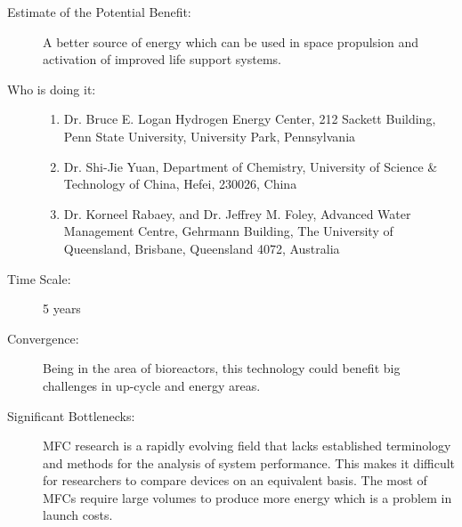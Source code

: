 \begin{description}
\item[Estimate  of the Potential Benefit:] A better source of energy which can
be used in space propulsion and  activation of improved life support
systems.
\item[Who is doing it:] \hfill
\begin{enumerate}
\item Dr. Bruce E. Logan Hydrogen  Energy Center, 212 Sackett Building,
Penn State  University, University Park, Pennsylvania
\item Dr. Shi-Jie Yuan, Department of  Chemistry, University of Science \&
Technology of China, Hefei, 230026,  China
\item Dr. Korneel Rabaey, and Dr.  Jeffrey M. Foley, Advanced Water
Management  Centre, Gehrmann Building, The University of Queensland,
Brisbane, Queensland 4072, Australia
\end{enumerate}
\item[Time Scale:] 5 years
\item[Convergence:] Being in the area  of bioreactors, this technology could
benefit big  challenges in up-cycle and energy areas.
\item[Significant Bottlenecks:]  \gls{MFC} research is a
rapidly evolving field that lacks  established terminology and methods
for the  analysis of system performance. This makes it difficult for
researchers to compare devices on an  equivalent basis.
The most of \glspl{MFC} require large volumes to produce more energy which is
a problem in launch costs.
\end{description}

 
